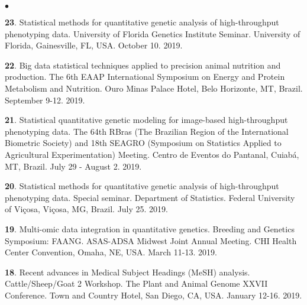 \documentclass[margin,line,10pt]{res}
\newenvironment{list2}{
  \begin{list}{$\bullet$}{%
      \setlength{\itemsep}{0in}
      \setlength{\parsep}{0in} \setlength{\parskip}{0in}
      \setlength{\topsep}{0in} \setlength{\partopsep}{0in} 
      \setlength{\leftmargin}{0.2in}}}{\end{list}}
\begin{document}
\begin{resume}
\begin{list2}
     \vspace{0.5cm}
    
  \item [{\bf 23}.] Statistical methods for quantitative genetic analysis of high-throughput phenotyping data.  University of Florida Genetics Institute Seminar. University of Florida, Gainesville, FL, USA. October 10. 2019. 

    \vspace{0.5cm}
    
\item [{\bf 22}.]  Big data statistical techniques applied to precision animal nutrition and production. The 6th EAAP International Symposium on Energy and Protein Metabolism and Nutrition. Ouro Minas Palace Hotel, Belo Horizonte, MT, Brazil. September 9-12. 2019. 

  \vspace{0.5cm}
  
 \item [{\bf 21}.] Statistical quantitative genetic modeling for image-based high-throughput phenotyping data. The 64th RBras (The Brazilian  Region  of the International Biometric Society) and 18th SEAGRO (Symposium on Statistics Applied to Agricultural Experimentation) Meeting. Centro de Eventos do Pantanal, Cuiab{\'a}, MT, Brazil. July 29 - August 2. 2019. 

   \vspace{0.5cm}

   
 \item [{\bf 20}.]      
     Statistical methods for quantitative genetic analysis of high-throughput phenotyping data. Special seminar. Department of Statistics. Federal University of Vi\c cosa, Vi\c cosa, MG, Brazil. July 25. 2019. 
   
    
   \vspace{0.5cm}
   
   \item [{\bf 19}.]  Multi-omic data integration in quantitative genetics. Breeding and Genetics Symposium: FAANG. ASAS-ADSA Midwest Joint Annual Meeting. CHI Health Center Convention, Omaha, NE, USA. March 11-13. 2019. 

  \vspace{0.5cm}

 \item [{\bf 18}.] Recent advances in Medical Subject Headings (MeSH) analysis. Cattle/Sheep/Goat 2 Workshop. The Plant and Animal Genome XXVII Conference. Town and Country Hotel, San Diego, CA, USA. January 12-16. 2019. 


\end{list2}
\end{resume}
\end{document}
